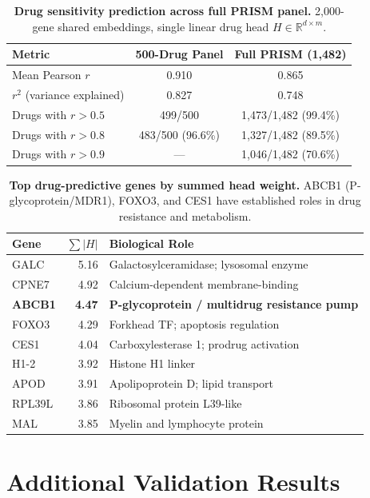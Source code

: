 \documentclass{article}
\theoremstyle{definition}
\begin{document}
\begin{table}[H]
\centering
\caption{\textbf{Drug sensitivity prediction across full PRISM panel.} 2,000-gene shared embeddings, single linear drug head $H \in \mathbb{R}^{d \times m}$.}
\label{tab:drug_detail}
\small
\begin{tabular}{lcc}
\toprule
Metric & 500-Drug Panel & Full PRISM (1,482) \\
\midrule
Mean Pearson $r$ & 0.910 & 0.865 \\
$r^2$ (variance explained) & 0.827 & 0.748 \\
Drugs with $r > 0.5$ & 499/500 & 1,473/1,482 (99.4\%) \\
Drugs with $r > 0.8$ & 483/500 (96.6\%) & 1,327/1,482 (89.5\%) \\
Drugs with $r > 0.9$ & --- & 1,046/1,482 (70.6\%) \\
\bottomrule
\end{tabular}
\end{table}

\begin{table}[H]
\centering
\caption{\textbf{Top drug-predictive genes by summed head weight.} ABCB1 (P-glycoprotein/MDR1), FOXO3, and CES1 have established roles in drug resistance and metabolism.}
\label{tab:gene_imp}
\small
\begin{tabular}{lrl}
\toprule
Gene & $\sum|H|$ & Biological Role \\
\midrule
GALC & 5.16 & Galactosylceramidase; lysosomal enzyme \\
CPNE7 & 4.92 & Calcium-dependent membrane-binding \\
\textbf{ABCB1} & \textbf{4.47} & \textbf{P-glycoprotein / multidrug resistance pump} \\
FOXO3 & 4.29 & Forkhead TF; apoptosis regulation \\
CES1 & 4.04 & Carboxylesterase 1; prodrug activation \\
H1-2 & 3.92 & Histone H1 linker \\
APOD & 3.91 & Apolipoprotein D; lipid transport \\
RPL39L & 3.86 & Ribosomal protein L39-like \\
MAL & 3.85 & Myelin and lymphocyte protein \\
\bottomrule
\end{tabular}
\end{table}

\section{Additional Validation Results}
\end{document}
